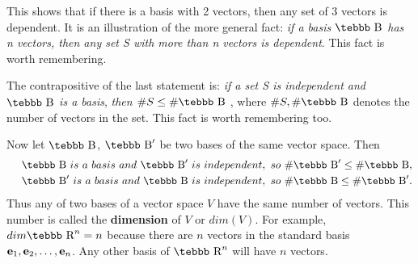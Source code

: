 This shows that if there is a basis with 2 vectors, then any set
of 3 vectors is dependent. It is an illustration of the more
general fact: {\em if a basis $\mbox {\tebbb B}$ has n vectors,
then any set S with more than n vectors is dependent}. This fact
is worth remembering.

The contrapositive of the last statement is: {\em if a set S is
independent and $\mbox {\tebbb B}$ is a basis}, {\em then $\#S
\leq \#\mbox {\tebbb B}$ }, where $\#S, \#\mbox {\tebbb B}$
denotes the number of vectors in the set. This fact is worth
remembering too.

Now let $\mbox {\tebbb B}$, $\mbox {\tebbb B}'$ be two bases of
the same vector space. Then
\begin{eqnarray*}
&~&\mbox {\tebbb B}~is~a~basis~and ~\mbox {\tebbb
B}'~is~independent,~so ~\#\mbox {\tebbb B}'\leq \#\mbox
{\tebbb B}, \\
&~&\mbox {\tebbb B}'~is~a~basis~and~ \mbox {\tebbb
B}~is~independent,~so ~\#\mbox {\tebbb B}\leq \#\mbox {\tebbb B}'.
\end{eqnarray*}
Thus any of two bases of a vector space $V$ have the same number
of vectors. This number is called the {\bf dimension} of $V$ or
$dim(V)$. For example, $dim \mbox {\tebbb R}^n=n$ because there
are $n$ vectors in the standard basis ${ {\bf e}_1,{\bf
e}_2,\ldots,{\bf e}_n}$. Any other basis of $\mbox {\tebbb R}^n$
will have $n$ vectors.

